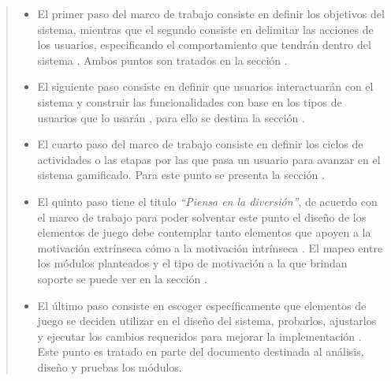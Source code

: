    \begin{quote}
    \begin{itemize}
    \item El primer paso del marco de trabajo consiste en definir los objetivos del
          sistema, mientras que el segundo consiste en delimitar las acciones de los
          usuarios, especificando el comportamiento que tendrán dentro del sistema
          \cite[p. 61, 63]{ForTheWin}. Ambos puntos son tratados en la sección
          .\\

    \item El siguiente paso consiste en definir que usuarios interactuarán con el
          sistema y construir las funcionalidades con base en los tipos de usuarios
          que lo usarán \cite[p. 64]{ForTheWin}, para ello se destina la sección
          .\\

    \item El cuarto paso del marco de trabajo consiste en definir los ciclos de
          actividades o las etapas por las que pasa un usuario para avanzar en el
          sistema gamificado. \cite[p. 66]{ForTheWin} Para este punto se presenta
          la sección .\\

    \item El quinto paso tiene el titulo {\it``Piensa en la diversión''}, de acuerdo
          con el marco de trabajo para poder solventar este punto el diseño de los
          elementos de juego debe contemplar tanto elementos que apoyen a la
          motivación extrínseca cómo a la motivación intrínseca \cite[p. 68]%
          {ForTheWin}. El mapeo entre los módulos planteados y el tipo de motivación
          a la que brindan soporte se puede ver en la sección
          .\\

    \item El último paso consiste en escoger específicamente que elementos de juego
          se deciden utilizar en el diseño del sistema, probarlos, ajustarlos y
          ejecutar los cambios requeridos para mejorar la implementación
          \cite[p. 69]{ForTheWin}. Este punto es tratado en parte del documento
          destinada al análisis, diseño y pruebas los módulos.
    \end{itemize}
    \end{quote}

